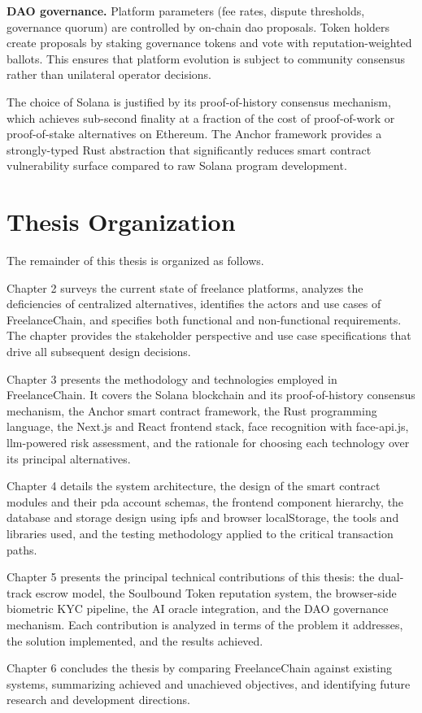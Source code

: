 \textbf{DAO governance.} Platform parameters (fee rates, dispute thresholds, governance quorum) are controlled by on-chain \gls{dao} proposals. Token holders create proposals by staking governance tokens and vote with reputation-weighted ballots. This ensures that platform evolution is subject to community consensus rather than unilateral operator decisions.

The choice of Solana is justified by its proof-of-history consensus mechanism, which achieves sub-second finality at a fraction of the cost of proof-of-work or proof-of-stake alternatives on Ethereum. The Anchor framework provides a strongly-typed Rust abstraction that significantly reduces smart contract vulnerability surface compared to raw Solana program development.

\section{Thesis Organization}
\label{section:1.4}

The remainder of this thesis is organized as follows.

Chapter 2 surveys the current state of freelance platforms, analyzes the deficiencies of centralized alternatives, identifies the actors and use cases of FreelanceChain, and specifies both functional and non-functional requirements. The chapter provides the stakeholder perspective and use case specifications that drive all subsequent design decisions.

Chapter 3 presents the methodology and technologies employed in FreelanceChain. It covers the Solana blockchain and its proof-of-history consensus mechanism, the Anchor smart contract framework, the Rust programming language, the Next.js and React frontend stack, face recognition with face-api.js, \gls{llm}-powered risk assessment, and the rationale for choosing each technology over its principal alternatives.

Chapter 4 details the system architecture, the design of the smart contract modules and their \gls{pda} account schemas, the frontend component hierarchy, the database and storage design using \gls{ipfs} and browser localStorage, the tools and libraries used, and the testing methodology applied to the critical transaction paths.

Chapter 5 presents the principal technical contributions of this thesis: the dual-track escrow model, the Soulbound Token reputation system, the browser-side biometric KYC pipeline, the AI oracle integration, and the DAO governance mechanism. Each contribution is analyzed in terms of the problem it addresses, the solution implemented, and the results achieved.

Chapter 6 concludes the thesis by comparing FreelanceChain against existing systems, summarizing achieved and unachieved objectives, and identifying future research and development directions.
